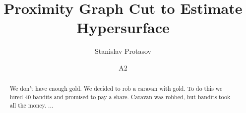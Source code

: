 \documentclass[twocolumn,final]{svjour3}
\begin{document}
\author{Stanislav Protasov \and A2}
\title{Proximity Graph Cut to Estimate Hypersurface}
\maketitle{}					%


\begin{abstract}
We don't have enough gold.
We decided to rob a caravan with gold.
To do this we hired 40 bandits and promised to pay a share.
Caravan was robbed, but bandits took all the money.
...
\end{abstract}










\end{document}
